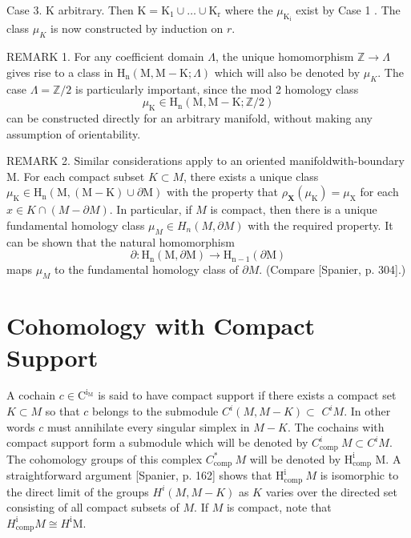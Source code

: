 \documentclass[10pt]{article}
\begin{document}
Case 3. $\mathrm{K}$ arbitrary. Then $\mathrm{K}=\mathrm{K}_{1} \cup \ldots \cup \mathrm{K}_{\mathrm{r}}$ where the $\mu_{\mathrm{K}_{\mathrm{i}}}$ exist by Case 1 . The class $\mu_{K}$ is now constructed by induction on $r$.

REMARK 1. For any coefficient domain $\Lambda$, the unique homomorphism $\mathbb{Z} \rightarrow \Lambda$ gives rise to a class in $\mathrm{H}_{\mathrm{n}}(\mathrm{M}, \mathrm{M}-\mathrm{K} ; \Lambda)$ which will also be denoted by $\mu_{K}$. The case $\Lambda=\mathbb{Z} / 2$ is particularly important, since the mod 2 homology class
$$
\mu_{\mathrm{K}} \in \mathrm{H}_{\mathrm{n}}(\mathrm{M}, \mathrm{M}-\mathrm{K} ; \mathbb{Z} / 2)
$$
can be constructed directly for an arbitrary manifold, without making any assumption of orientability.

REMARK 2. Similar considerations apply to an oriented manifoldwith-boundary M. For each compact subset $K \subset M$, there exists a unique class $\mu_{\mathrm{K}} \in \mathrm{H}_{\mathrm{n}}(\mathrm{M},(\mathrm{M}-\mathrm{K}) \cup \partial \mathrm{M})$ with the property that $\rho_{\mathbf{X}}\left(\mu_{\mathrm{K}}\right)=\mu_{\mathrm{X}}$ for each $x \in K \cap(M-\partial M)$. In particular, if $M$ is compact, then there is a unique fundamental homology class $\mu_{M} \in H_{n}(M, \partial M)$ with the required property. It can be shown that the natural homomorphism
$$
\partial: \mathrm{H}_{\mathrm{n}}(\mathrm{M}, \partial \mathrm{M}) \rightarrow \mathrm{H}_{\mathrm{n}-1}(\partial \mathrm{M})
$$
maps $\mu_{M}$ to the fundamental homology class of $\partial M$. (Compare [Spanier, p. 304].)

\section{Cohomology with Compact Support}
A cochain $c \in \mathrm{C}^{\mathrm{i}_{\mathrm{M}}}$ is said to have compact support if there exists a compact set $K \subset M$ so that $c$ belongs to the submodule $C^{i}(M, M-K) \subset$ $C^{i} M$. In other words $c$ must annihilate every singular simplex in $M-K$. The cochains with compact support form a submodule which will be denoted by $C_{\text {comp }}^{i} M \subset C^{i} M$. The cohomology groups of this complex $C_{\text {comp }}^{*} M$ will be denoted by $\mathrm{H}_{\mathrm{comp}}^{\mathrm{i}}$ M. A straightforward argument [Spanier, p. 162] shows that $\mathrm{H}_{\text {comp }}^{\mathrm{i}} M$ is isomorphic to the direct limit of the groups $H^{i}(M, M-K)$ as $K$ varies over the directed set consisting of all compact subsets of $M$. If $M$ is compact, note that $H_{\operatorname{comp}}^{\mathrm{i}} M \cong H^{\mathrm{i}} \mathrm{M}$.
\end{document}
